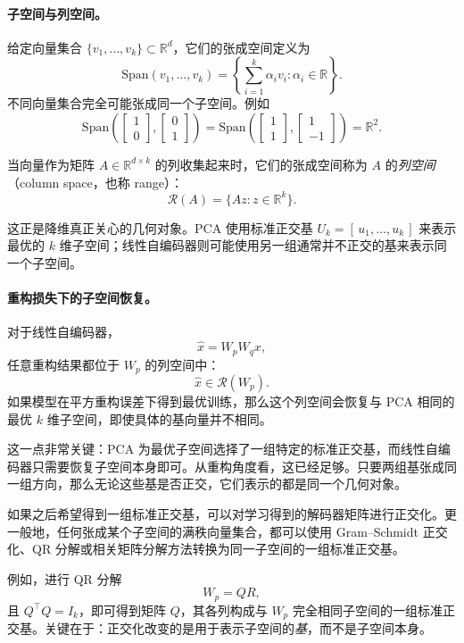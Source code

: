 \paragraph{子空间与列空间。}
给定向量集合 \(\{v_1,\ldots,v_k\}\subset\mathbb{R}^d\)，它们的张成空间定义为
\[
\mathrm{Span}(v_1,\ldots,v_k)
=
\left\{
\sum_{i=1}^k \alpha_i v_i:\alpha_i\in\mathbb{R}
\right\}.
\]
不同向量集合完全可能张成同一个子空间。例如
\[
\mathrm{Span}\!\left(
\begin{bmatrix}1\\0\end{bmatrix},
\begin{bmatrix}0\\1\end{bmatrix}
\right)
=
\mathrm{Span}\!\left(
\begin{bmatrix}1\\1\end{bmatrix},
\begin{bmatrix}1\\-1\end{bmatrix}
\right)
=
\mathbb{R}^2.
\]

当向量作为矩阵 \(A\in\mathbb{R}^{d\times k}\) 的列收集起来时，它们的张成空间称为 \(A\) 的\emph{列空间}（column space，也称 range）：
\[
\mathcal{R}(A)
=
\{Az:z\in\mathbb{R}^k\}.
\]

这正是降维真正关心的几何对象。PCA 使用标准正交基 \(U_k=[\,u_1,\dots,u_k\,]\) 来表示最优的 \(k\) 维子空间；线性自编码器则可能使用另一组通常并不正交的基来表示同一个子空间。

\paragraph{重构损失下的子空间恢复。}
对于线性自编码器，
\[
\hat{x}=W_pW_qx,
\]
任意重构结果都位于 \(W_p\) 的列空间中：
\[
\hat{x} \in \mathcal{R}(W_p).
\]
如果模型在平方重构误差下得到最优训练，那么这个列空间会恢复与 PCA 相同的最优 \(k\) 维子空间，即使具体的基向量并不相同。

这一点非常关键：PCA 为最优子空间选择了一组特定的标准正交基，而线性自编码器只需要恢复子空间本身即可。从重构角度看，这已经足够。只要两组基张成同一组方向，那么无论这些基是否正交，它们表示的都是同一个几何对象。

如果之后希望得到一组标准正交基，可以对学习得到的解码器矩阵进行正交化。更一般地，任何张成某个子空间的满秩向量集合，都可以使用 Gram--Schmidt 正交化、QR 分解或相关矩阵分解方法转换为同一子空间的一组标准正交基。

例如，进行 QR 分解
\[
W_p=QR,
\]
且 \(Q^\top Q=I_k\)，即可得到矩阵 \(Q\)，其各列构成与 \(W_p\) 完全相同子空间的一组标准正交基。关键在于：正交化改变的是用于表示子空间的\emph{基}，而不是子空间本身。

